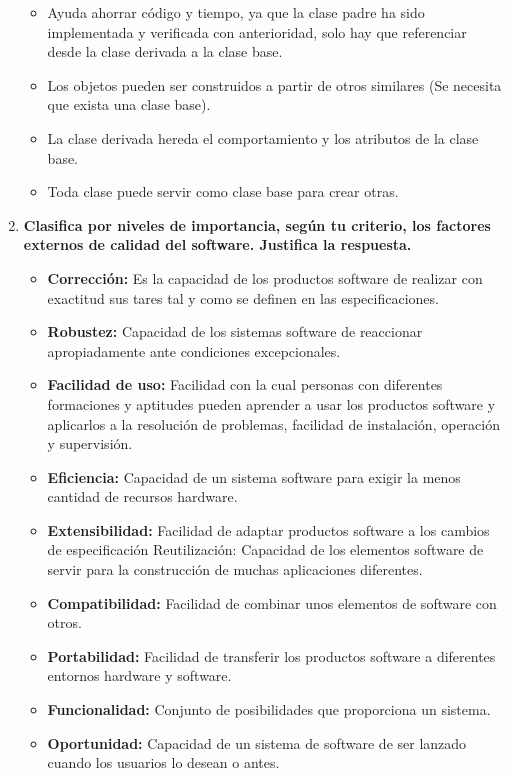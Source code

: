 \documentclass[12pt,letterpaper]{article}
\begin{document}
\begin{enumerate}
		\begin{itemize}		
			\item Ayuda ahorrar código y tiempo, ya que la clase padre ha sido implementada y verificada con anterioridad, solo hay que referenciar desde la clase derivada a la clase base.
			
			\item Los objetos pueden ser construidos a partir de otros similares (Se necesita que exista una clase base).
			
			\item La clase derivada hereda el comportamiento y los atributos de la clase base.
			
			\item Toda clase puede servir como clase base para crear otras.
		\end{itemize}
	
		\item \textbf{Clasifica por niveles de importancia, según tu criterio, los factores externos de calidad del software. Justifica la respuesta.}
		\begin{itemize}
			\item \textbf{Corrección:} Es la capacidad de los productos software de realizar con exactitud sus tares
			tal y como se definen en las especificaciones.
			\item \textbf{Robustez:} Capacidad de los sistemas software de reaccionar apropiadamente ante condiciones excepcionales.
			\item \textbf{Facilidad de uso:} Facilidad con la cual personas con diferentes formaciones y aptitudes
			pueden aprender a usar los productos software y aplicarlos a la resolución de problemas, facilidad de instalación, operación y supervisión.
			\item \textbf{Eficiencia:} Capacidad de un sistema software para exigir la menos cantidad de recursos
			hardware.
			\item \textbf{Extensibilidad:} Facilidad de adaptar productos software a los cambios de especificación
			Reutilización: Capacidad de los elementos software de servir para la construcción de muchas aplicaciones diferentes.
			\item \textbf{Compatibilidad:} Facilidad de combinar unos elementos de software con otros.
			\item \textbf{Portabilidad:} Facilidad de transferir los productos software a diferentes entornos hardware y software.
			\item \textbf{Funcionalidad:} Conjunto de posibilidades que proporciona un sistema.
			\item \textbf{Oportunidad:} Capacidad de un sistema de software de ser lanzado cuando los usuarios lo desean o antes.
		\end{itemize}
	

\end{enumerate}
\end{document}
